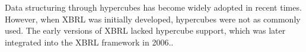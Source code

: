 







Data structuring through hypercubes has become widely adopted in recent times.
However, when XBRL was initially developed, hypercubes were not as commonly used.
The early versions of XBRL lacked hypercube support,
which was later integrated into the XBRL framework in 2006.\cite{xbrl_dimensions}.

